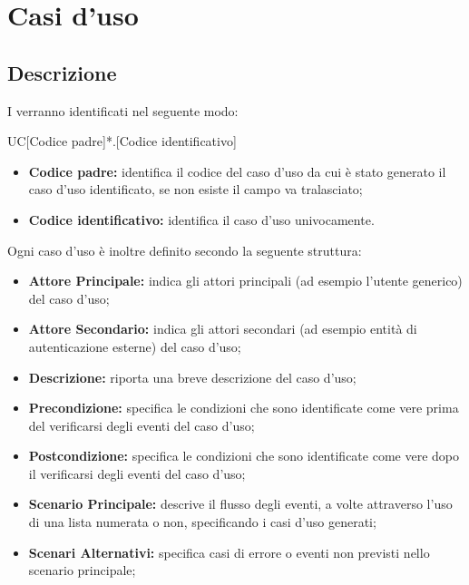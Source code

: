 \documentclass[../AnalisideiRequisiti.tex]{subfiles}
\begin{document}

	\chapter{Casi d'uso}
	\section{Descrizione}
	I  verranno identificati nel seguente modo: 
	
	\begin{center}
		UC[Codice padre]*.[Codice identificativo]
	\end{center}
	
	\begin{itemize}
		\item \textbf{Codice padre:} identifica il codice del caso d'uso da cui è stato generato il caso d'uso identificato, se non esiste il campo va tralasciato;
		\item \textbf{Codice identificativo:} identifica il caso d'uso univocamente.
	\end{itemize}
	
	\noindent Ogni caso d'uso è inoltre definito secondo la seguente struttura:
	\begin{itemize}
		\item \textbf{Attore Principale:} indica gli attori principali (ad esempio l'utente generico) del caso d'uso;
		\item \textbf{Attore Secondario:} indica gli attori secondari (ad esempio entità di autenticazione esterne) del caso d'uso;
		\item \textbf{Descrizione:} riporta una breve descrizione del caso d'uso;
		\item \textbf{Precondizione:} specifica le condizioni che sono identificate come vere prima del verificarsi degli eventi del caso d'uso;
		\item \textbf{Postcondizione:} specifica 	le condizioni che sono identificate come vere dopo il verificarsi degli eventi del caso d'uso;
		\item \textbf{Scenario Principale:} descrive il flusso degli eventi, a volte attraverso l'uso di una lista numerata o non, specificando i casi d'uso generati;
		\item \textbf{Scenari Alternativi:} specifica casi di errore o eventi non previsti nello scenario principale;
		
	\end{itemize}
\end{document}
